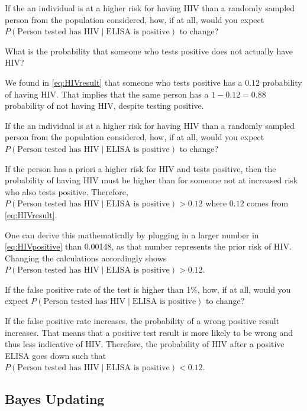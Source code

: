 \documentclass[]{book}
\theoremstyle{definition}
\theoremstyle{definition}
\theoremstyle{definition}
\theoremstyle{remark}
\let\BeginKnitrBlock\begin \let\EndKnitrBlock\end
\begin{document}
If the an individual is at a higher risk for having HIV than a randomly
sampled person from the population considered, how, if at all, would you
expect \(P(\text{Person tested has HIV} \mid \text{ELISA is positive})\)
to change?

\BeginKnitrBlock{example}
\protect\hypertarget{exm:unnamed-chunk-3}{}{\label{exm:unnamed-chunk-3}
}What is the probability that someone who tests positive does not
actually have HIV?
\EndKnitrBlock{example}

We found in \eqref{eq:HIVresult} that someone who tests positive has a
\(0.12\) probability of having HIV. That implies that the same person
has a \(1-0.12=0.88\) probability of not having HIV, despite testing
positive.

\BeginKnitrBlock{example}
\protect\hypertarget{exm:unnamed-chunk-4}{}{\label{exm:unnamed-chunk-4} }If
the an individual is at a higher risk for having HIV than a randomly
sampled person from the population considered, how, if at all, would you
expect \(P(\text{Person tested has HIV} \mid \text{ELISA is positive})\)
to change?
\EndKnitrBlock{example}

If the person has a priori a higher risk for HIV and tests positive,
then the probability of having HIV must be higher than for someone not
at increased risk who also tests positive. Therefore,
\(P(\text{Person tested has HIV} \mid \text{ELISA is positive}) > 0.12\)
where \(0.12\) comes from \eqref{eq:HIVresult}.

One can derive this mathematically by plugging in a larger number in
\eqref{eq:HIVpositive} than 0.00148, as that number represents the prior
risk of HIV. Changing the calculations accordingly shows
\(P(\text{Person tested has HIV} \mid \text{ELISA is positive}) > 0.12\).

\BeginKnitrBlock{example}
\protect\hypertarget{exm:unnamed-chunk-5}{}{\label{exm:unnamed-chunk-5} }If
the false positive rate of the test is higher than 1\%, how, if at all,
would you expect
\(P(\text{Person tested has HIV} \mid \text{ELISA is positive})\) to
change?
\EndKnitrBlock{example}

If the false positive rate increases, the probability of a wrong
positive result increases. That means that a positive test result is
more likely to be wrong and thus less indicative of HIV. Therefore, the
probability of HIV after a positive ELISA goes down such that
\(P(\text{Person tested has HIV} \mid \text{ELISA is positive}) < 0.12\).

\subsection{Bayes Updating}\label{bayes-updating}
\end{document}
